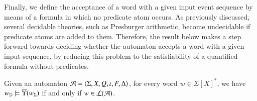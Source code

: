 
Finally, we define the acceptance of a word with a given input event
sequence by means of a formula in which no predicate atom occurs. As
previously discussed, several decidable theories, such as Presburger
arithmetic, become undecidable if predicate atoms are added to
them. Therefore, the result below makes a step forward towards
deciding whether the automaton accepts a word with a given input
sequence, by reducing this problem to the satisfiability of a
quantified formula without predicates.

\begin{lemma}\label{lemma:quant-pred-acceptance}
  Given an automaton $\mathcal{A} = \langle \Sigma,X,Q,\iota,F,\Delta \rangle$, for
  every word $w \in \Sigma[X]^*$, we have ${w}_{\mathbb{D}} \models
  \overline{\Upsilon}({{w}_\Sigma})$ if and only if $w \in {\mathcal L}({\mathcal{A}})$.
\end{lemma}

